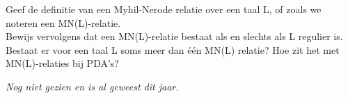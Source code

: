 \begin{question}
Geef de definitie van een Myhil-Nerode relatie over een taal L, of zoals we noteren een MN(L)-relatie. \\
Bewijs vervolgens dat een MN(L)-relatie bestaat als en slechts als L regulier is. Bestaat er voor een taal L soms meer dan één MN(L) relatie? Hoe zit het met MN(L)-relaties bij PDA’s?
\end{question}

\textit{Nog niet gezien en is al geweest dit jaar.}
